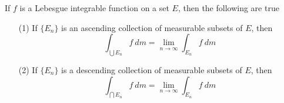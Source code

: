 \begin{theorem}\label{10.4.3}
    If $f$ is a Lebesgue integrable function on a set  $E$, then the following
    are true
    \begin{enumerate}
        \item[(1)] If $\{E_n\}$ is an ascending collection of measurable subsets
            of $E$, then
            \begin{equation*}
                \int_{\bigcup{E_n}}{f \ dm}=
                \lim_{n \xrightarrow{} \infty}{\int_{E_n}{f \ dm}}
            \end{equation*}

        \item[(2)] If $\{E_n\}$ is a descending collection of measurable subsets
            of $E$, then
            \begin{equation*}
                \int_{\bigcap{E_n}}{f \ dm}=
                \lim_{n \xrightarrow{} \infty}{\int_{E_n}{f \ dm}}
            \end{equation*}
    \end{enumerate}
\end{theorem}
